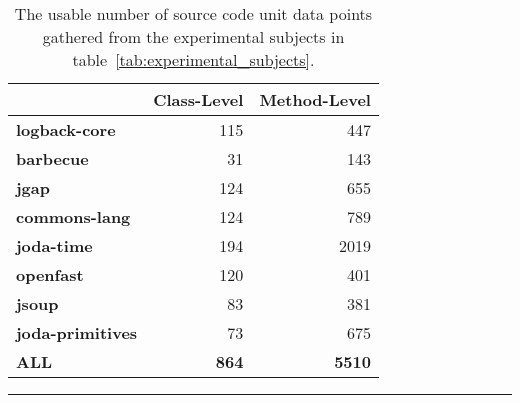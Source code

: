 \begin{landscape}
  \begin{table}[ht!]
    \centering
    \begin{threeparttable}
      \begin{tabular}{|l|r|r|}
        \rowcolor[RGB]{169,196,223}
        \hline & \textbf{Class-Level} & \textbf{Method-Level} \\
        \hline \cellcolor[RGB]{169,196,223} \textbf{logback-core} & 115 & 447 \\
        \hline \cellcolor[RGB]{169,196,223} \textbf{barbecue} & 31 & 143 \\
        \hline \cellcolor[RGB]{169,196,223} \textbf{jgap} & 124 & 655 \\
        \hline \cellcolor[RGB]{169,196,223} \textbf{commons-lang} & 124 & 789 \\
        \hline \cellcolor[RGB]{169,196,223} \textbf{joda-time} & 194 & 2019 \\
        \hline \cellcolor[RGB]{169,196,223} \textbf{openfast} & 120 & 401 \\
        \hline \cellcolor[RGB]{169,196,223} \textbf{jsoup} & 83 & 381 \\
        \hline \cellcolor[RGB]{169,196,223} \textbf{joda-primitives} & 73 & 675 \\
        \hline \cellcolor[RGB]{169,196,223} \textbf{ALL} & \textbf{864} & \textbf{5510} \\
        \hline
      \end{tabular}
    \end{threeparttable}
    \caption{The usable number of source code unit data points gathered from the experimental subjects in table~\ref{tab:experimental_subjects}.}
    \vspace{2mm}
    \hrule
    \label{tab:experiments_collected_data}
  \end{table}
\end{landscape}

